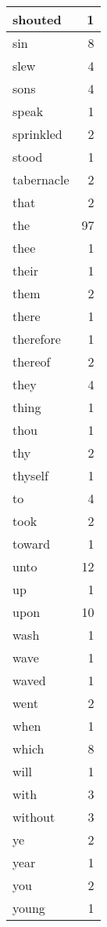 \begin{center}
\begin{longtable}{l|r}
shouted & 1 \\ \hline
sin & 8 \\ \hline
slew & 4 \\ \hline
sons & 4 \\ \hline
speak & 1 \\ \hline
sprinkled & 2 \\ \hline
stood & 1 \\ \hline
tabernacle & 2 \\ \hline
that & 2 \\ \hline
the & 97 \\ \hline
thee & 1 \\ \hline
their & 1 \\ \hline
them & 2 \\ \hline
there & 1 \\ \hline
therefore & 1 \\ \hline
thereof & 2 \\ \hline
they & 4 \\ \hline
thing & 1 \\ \hline
thou & 1 \\ \hline
thy & 2 \\ \hline
thyself & 1 \\ \hline
to & 4 \\ \hline
took & 2 \\ \hline
toward & 1 \\ \hline
unto & 12 \\ \hline
up & 1 \\ \hline
upon & 10 \\ \hline
wash & 1 \\ \hline
wave & 1 \\ \hline
waved & 1 \\ \hline
went & 2 \\ \hline
when & 1 \\ \hline
which & 8 \\ \hline
will & 1 \\ \hline
with & 3 \\ \hline
without & 3 \\ \hline
ye & 2 \\ \hline
year & 1 \\ \hline
you & 2 \\ \hline
young & 1 \\ \hline
\end{longtable}
\end{center}



\normalsize




